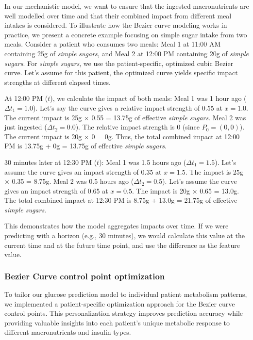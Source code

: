 In our mechanistic model, we want to ensure that the ingested macronutrients are well modelled over time and that their combined impact from different meal intakes is considered. To illustrate how the Bezier curve modeling works in practice, we present a concrete example focusing on simple sugar intake from two meals.
Consider a patient who consumes two meals: Meal 1 at 11:00 AM containing 25g of \textit{simple sugars}, and Meal 2 at 12:00 PM containing 20g of \textit{simple sugars}. For \textit{simple sugars}, we use the patient-specific, optimized cubic Bezier curve. Let's assume for this patient, the optimized curve yields specific impact strengths at different elapsed times.

At 12:00 PM (\(t\)), we calculate the impact of both meals:
Meal 1 was 1 hour ago (\(\Delta t_1 = 1.0\)). Let's say the curve gives a relative impact strength of 0.55 at \(x=1.0\). The current impact is 25g × 0.55 = 13.75g of effective \textit{simple sugars}.
Meal 2 was just ingested (\(\Delta t_2 = 0.0\)). The relative impact strength is 0 (since \(P_0 = (0,0)\)). The current impact is 20g × 0 = 0g.
Thus, the total combined impact at 12:00 PM is 13.75g + 0g = 13.75g of effective \textit{simple sugars}.

30 minutes later at 12:30 PM (\(t\)):
Meal 1 was 1.5 hours ago (\(\Delta t_1 = 1.5\)). Let's assume the curve gives an impact strength of 0.35 at \(x=1.5\). The impact is 25g × 0.35 = 8.75g.
Meal 2 was 0.5 hours ago (\(\Delta t_2 = 0.5\)). Let's assume the curve gives an impact strength of 0.65 at \(x=0.5\). The impact is 20g × 0.65 = 13.0g.
The total combined impact at 12:30 PM is 8.75g + 13.0g = 21.75g of effective \textit{simple sugars}.

This demonstrates how the model aggregates impacts over time. If we were predicting with a horizon (e.g., 30 minutes), we would calculate this value at the current time and at the future time point, and use the difference as the feature value.

\subsubsection{Bezier Curve control point optimization}
To tailor our glucose prediction model to individual patient metabolism patterns, we implemented a patient-specific optimization approach for the Bezier curve control points. This personalization strategy improves prediction accuracy while providing valuable insights into each patient's unique metabolic response to different macronutrients and insulin types.

